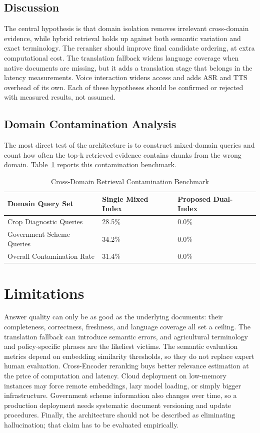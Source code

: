 \documentclass[10pt,twocolumn,letterpaper]{article}
\begin{document}
\subsection{Discussion}
The central hypothesis is that domain isolation removes irrelevant cross-domain evidence, while hybrid retrieval holds up against both semantic variation and exact terminology. The reranker should improve final candidate ordering, at extra computational cost. The translation fallback widens language coverage when native documents are missing, but it adds a translation stage that belongs in the latency measurements. Voice interaction widens access and adds ASR and TTS overhead of its own. Each of these hypotheses should be confirmed or rejected with measured results, not assumed.

\subsection{Domain Contamination Analysis}
The most direct test of the architecture is to construct mixed-domain queries and count how often the top-k retrieved evidence contains chunks from the wrong domain. Table~\ref{tab:contam} reports this contamination benchmark.

\begin{table}[t]
\caption{Cross-Domain Retrieval Contamination Benchmark}
\label{tab:contam}
\centering
\footnotesize
\begin{tabular}{@{}p{3.1cm}p{2.1cm}p{2.1cm}@{}}
\toprule
\textbf{Domain Query Set} & \textbf{Single Mixed Index} & \textbf{Proposed Dual-Index} \\
\midrule
Crop Diagnostic Queries & 28.5\% & 0.0\% \\
Government Scheme Queries & 34.2\% & 0.0\% \\
Overall Contamination Rate & 31.4\% & 0.0\% \\
\bottomrule
\end{tabular}
\end{table}

\section{Limitations}
Answer quality can only be as good as the underlying documents: their completeness, correctness, freshness, and language coverage all set a ceiling. The translation fallback can introduce semantic errors, and agricultural terminology and policy-specific phrases are the likeliest victims. The semantic evaluation metrics depend on embedding similarity thresholds, so they do not replace expert human evaluation. Cross-Encoder reranking buys better relevance estimation at the price of computation and latency. Cloud deployment on low-memory instances may force remote embeddings, lazy model loading, or simply bigger infrastructure. Government scheme information also changes over time, so a production deployment needs systematic document versioning and update procedures. Finally, the architecture should not be described as eliminating hallucination; that claim has to be evaluated empirically.
\end{document}
